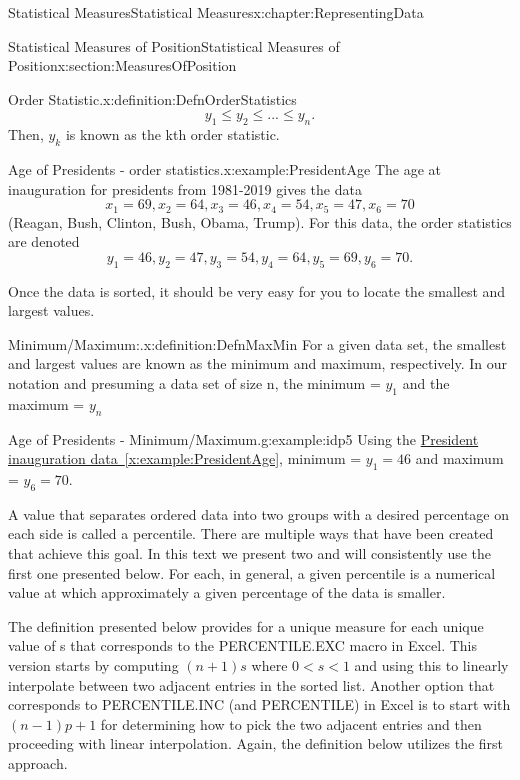 \documentclass[oneside,10pt,]{book}
\newcommand{\xreffont}{\relax}
\numberwithin{equation}{section}
\begin{document}
\begin{chapterptx}{Statistical Measures}{}{Statistical Measures}{}{}{x:chapter:RepresentingData}
\begin{sectionptx}{Statistical Measures of Position}{}{Statistical Measures of Position}{}{}{x:section:MeasuresOfPosition}
\begin{definition}{Order Statistic.}{x:definition:DefnOrderStatistics}
\begin{equation*}
y_1 \le y_2 \le ... \le y_n.
\end{equation*}
Then, \(y_k\) is known as the kth order statistic.%
\end{definition}
\begin{example}{Age of Presidents - order statistics.}{x:example:PresidentAge}%
The age at inauguration for presidents from 1981-2019 gives the data%
\begin{equation*}
x_1 = 69, x_2 = 64, x_3 = 46, x_4 = 54, x_5 = 47, x_6 = 70
\end{equation*}
(Reagan, Bush, Clinton, Bush, Obama, Trump). For this data, the order statistics are denoted%
\begin{equation*}
y_1 = 46, y_2 = 47, y_3 = 54, y_4 = 64, y_5 = 69, y_6 = 70.
\end{equation*}
%
\end{example}
Once the data is sorted, it should be very easy for you to locate the smallest and largest values.%
\begin{definition}{Minimum\slash{}Maximum:.}{x:definition:DefnMaxMin}%
For a given data set, the smallest and largest values are known as the minimum and maximum, respectively. In our notation and presuming a data set of size n, the minimum = \(y_1\) and the maximum = \(y_n\)%
\end{definition}
\begin{example}{Age of Presidents - Minimum\slash{}Maximum.}{g:example:idp5}%
Using the \hyperref[x:example:PresidentAge]{President inauguration data~{\xreffont\ref{x:example:PresidentAge}}}, minimum = \(y_1 = 46\) and maximum = \(y_6 = 70\).%
\end{example}
A value that separates ordered data into two groups with a desired percentage on each side is called a percentile. There are multiple ways that have been created that achieve this goal. In this text we present two and will consistently use the first one presented below. For each, in general, a given percentile is a numerical value at which approximately a given percentage of the data is smaller.%
\par
The definition presented below provides for a unique measure for each unique value of s that corresponds to the PERCENTILE.EXC macro in Excel.  This version starts by computing \((n+1)s\) where \(0 < s < 1\) and using this to linearly interpolate between two adjacent entries in the sorted list.  Another option that corresponds to PERCENTILE.INC (and PERCENTILE) in Excel is to start with \((n-1)p+1\) for determining how to pick the two adjacent entries and then proceeding with linear interpolation. Again, the definition below utilizes the first approach.%

\end{sectionptx}
\end{chapterptx}
\end{document}
